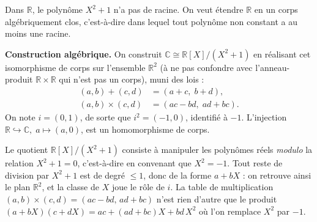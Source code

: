 ﻿%



Dans $\mathbb{R}$, le polynôme $X^2 + 1$ n'a pas de racine. On veut étendre
$\mathbb{R}$ en un corps algébriquement clos, c'est-à-dire dans lequel
tout polynôme non constant a au moins une racine.

\begin{tcolorbox}[thmbox]
  \textbf{Construction algébrique.}\enspace%
  On construit $\mathbb{C}\cong\mathbb{R}[X]/(X^2+1)$ en réalisant cet isomorphisme
  de corps sur l'ensemble $\mathbb{R}^2$ (à ne pas confondre avec l'anneau-produit
  $\mathbb{R}\times\mathbb{R}$ qui n'est pas un corps), muni des lois :
  \begin{align*}
    (a,b) + (c,d) &= (a+c,\; b+d), \\
    (a,b) \times (c,d) &= (ac-bd,\; ad+bc).
  \end{align*}
  On note $i = (0,1)$, de sorte que $i^2 = (-1, 0)$, identifié à $-1$.
  L'injection $\mathbb{R} \hookrightarrow \mathbb{C},\; a \mapsto (a,0)$,
  est un homomorphisme de corps.
\end{tcolorbox}

\begin{significationintuitive}
  Le quotient $\mathbb{R}[X]/(X^2+1)$ consiste à manipuler les polynômes réels
  \emph{modulo} la relation $X^2+1 = 0$, c'est-à-dire en convenant que $X^2 = -1$.
  Tout reste de division par $X^2+1$ est de degré $\leq 1$, donc de la forme
  $a + bX$ : on retrouve ainsi le plan $\mathbb{R}^2$, et la classe de $X$ joue le
  rôle de $i$. La table de multiplication $(a,b)\times(c,d) = (ac-bd,\,ad+bc)$
  n'est rien d'autre que le produit $(a+bX)(c+dX) = ac + (ad+bc)X + bd\,X^2$ où
  l'on remplace $X^2$ par $-1$.
\end{significationintuitive}

\decsep{}

